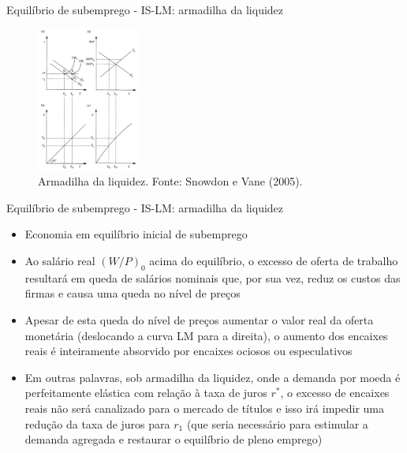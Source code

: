 \documentclass[10pt]{beamer}
\begin{document}
\begin{frame}{Equilíbrio de subemprego - IS-LM: armadilha da liquidez}
    \begin{figure}
        \centering
        \includegraphics[width=0.3\textwidth]{./figures/aula7_fig2.PNG}
        \caption{Armadilha da liquidez. Fonte: Snowdon e Vane (2005).}
        \label{fig2}
    \end{figure}
\end{frame}

\begin{frame}{Equilíbrio de subemprego - IS-LM: armadilha da liquidez}
    \begin{itemize}
        \item Economia em equilíbrio inicial de subemprego
        \bigskip
        \item Ao salário real $(W/P)_0$ acima do equilíbrio, o excesso de oferta de trabalho resultará em queda de salários nominais que, por sua vez, reduz os custos das firmas e causa uma queda no nível de preços
        \bigskip
        \item Apesar de esta queda do nível de preços aumentar o valor real da oferta monetária (deslocando a curva LM para a direita), o aumento dos encaixes reais é inteiramente absorvido por encaixes ociosos ou especulativos
        \bigskip
        \item Em outras palavras, sob armadilha da liquidez, onde a demanda por moeda é perfeitamente elástica com relação à taxa de juros $r^*$, o excesso de encaixes reais não será canalizado para o mercado de títulos e isso irá impedir uma redução da taxa de juros para $r_1$ (que seria necessário para estimular a demanda agregada e restaurar o equilíbrio de pleno emprego)
    \end{itemize}
\end{frame}
\end{document}
